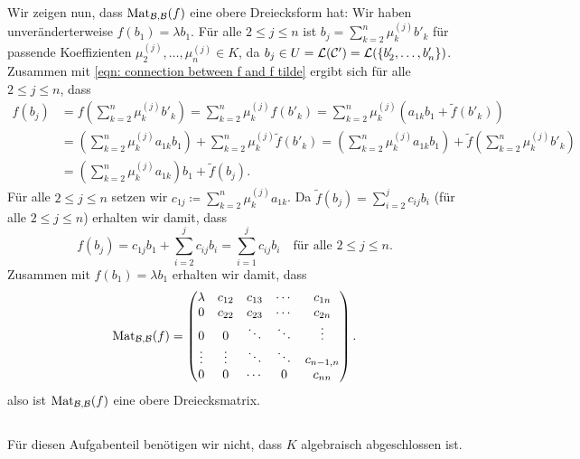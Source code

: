 \documentclass[a4paper,10pt]{scrartcl}
\begin{document}
Wir zeigen nun, dass $\mathrm{Mat}_{\mathcal{B},\mathcal{B}}(f)$ eine obere Dreiecksform hat: Wir haben unveränderterweise $f(b_1) = \lambda b_1$. Für alle $2 \leq j \leq n$ ist $b_j = \sum_{k=2}^n \mu^{(j)}_k b'_k$ für passende Koeffizienten $\mu^{(j)}_2, \dotsc, \mu^{(j)}_n \in K$, da $b_j \in U = \mathcal{L}(\mathcal{C'}) = \mathcal{L}(\{b'_2, \dotsc, b'_n\})$. Zusammen mit \eqref{eqn: connection between f and f tilde} ergibt sich für alle  $2 \leq j \leq n$, dass
\begin{align*}
 f(b_j)
 &= f\left( \sum_{k=2}^n \mu^{(j)}_k b'_k \right)
 = \sum_{k=2}^n \mu^{(j)}_k f(b'_k)
 = \sum_{k=2}^n \mu^{(j)}_k (a_{1k} b_1 + \tilde{f}(b'_k)) \\
 &= \left( \sum_{k=2}^n \mu^{(j)}_k a_{1k} b_1 \right) + \sum_{k=2}^n \mu^{(j)}_k \tilde{f}(b'_k)
 = \left( \sum_{k=2}^n \mu^{(j)}_k a_{1k} b_1 \right) + \tilde{f}\left( \sum_{k=2}^n \mu^{(j)}_k b'_k \right) \\
 &= \left( \sum_{k=2}^n \mu^{(j)}_k a_{1k} \right)b_1 + \tilde{f}\left( b_j \right).
\end{align*}
Für alle $2 \leq j \leq n$ setzen wir $c_{1j} \coloneqq \sum_{k=2}^n \mu^{(j)}_k a_{1k}$. Da $\tilde{f}(b_j) = \sum_{i=2}^j c_{ij} b_i$ (für alle $2 \leq j \leq n$) erhalten wir damit, dass
\[
 f(b_j)
 = c_{1j} b_1 + \sum_{i=2}^j c_{ij} b_i
 = \sum_{i=1}^j c_{ij} b_i
 \quad\text{für alle $2 \leq j \leq n$}.
\]
Zusammen mit $f(b_1) = \lambda b_1$ erhalten wir damit, dass
\[
 \mathrm{Mat}_{\mathcal{B},\mathcal{B}}(f)
 =
 \begin{pmatrix}
  \lambda & c_{12} & c_{13} & \cdots & c_{1n}    \\
  0       & c_{22} & c_{23} & \cdots & c_{2n}    \\
  0       & 0      & \ddots & \ddots & \vdots    \\
  \vdots  & \vdots & \ddots & \ddots & c_{n-1,n} \\
  0       & 0      & \cdots & 0      & c_{nn}
 \end{pmatrix}.
\]
also ist $\mathrm{Mat}_{\mathcal{B},\mathcal{B}}(f)$ eine obere Dreiecksmatrix.





\subsection{}
Für diesen Aufgabenteil benötigen wir nicht, dass $K$ algebraisch abgeschlossen ist.
\end{document}
